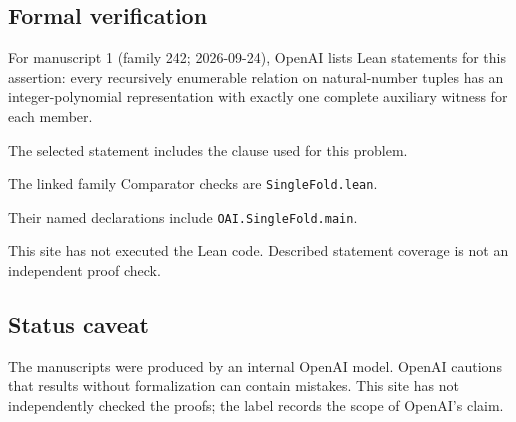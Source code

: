 \documentclass[11pt]{article}
\begin{document}
\subsection{Formal verification}
For manuscript 1 (family 242; 2026-09-24), OpenAI lists Lean statements for this assertion: every recursively enumerable relation on natural-number tuples has an integer-polynomial representation with exactly one complete auxiliary witness for each member.

The selected statement includes the clause used for this problem.

The linked family Comparator checks are \texttt{SingleFold.lean}.

Their named declarations include \texttt{OAI.SingleFold.main}.

This site has not executed the Lean code. Described statement coverage is not an independent proof check.

\subsection{Status caveat}
The manuscripts were produced by an internal OpenAI model. OpenAI cautions that results without formalization can contain mistakes. This site has not independently checked the proofs; the label records the scope of OpenAI's claim.
\end{document}
